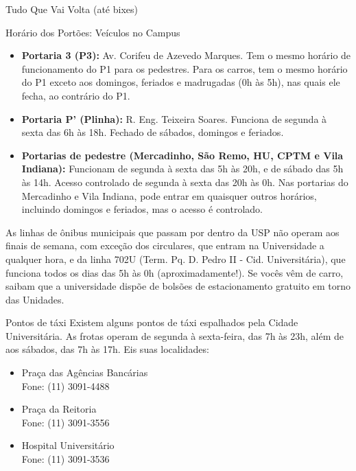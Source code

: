 \begin{secao}{Tudo Que Vai Volta (até bixes)}
\begin{subsecao}{Horário dos Portões: Veículos no Campus}
\begin{itemize}
  \item {\bf Portaria 3 (P3):} Av. Corifeu de Azevedo Marques. Tem o mesmo
  	horário de funcionamento do P1 para os pedestres. Para os carros, tem o
	mesmo horário do P1 exceto aos domingos, feriados e madrugadas (0h às 5h),
	nas quais ele fecha, ao contrário do P1.

  \item {\bf Portaria P' (Plinha):} R. Eng. Teixeira Soares. Funciona de segunda
  	à sexta das 6h às 18h. Fechado de sábados, domingos e feriados.

  \item {\bf Portarias de pedestre (Mercadinho, São Remo, HU, CPTM e
  	Vila Indiana):} Funcionam de segunda à sexta das 5h às 20h, e de sábado
	das 5h às 14h. Acesso controlado de segunda à sexta das 20h às 0h.
	Nas portarias do Mercadinho e Vila Indiana, pode entrar em quaisquer
	outros horários, incluindo domingos e feriados, mas o acesso é controlado.

\end{itemize}

As linhas de ônibus municipais que passam por dentro da USP não operam aos
finais de semana, com exceção dos circulares, que entram na Universidade a
qualquer hora, e da linha 702U (Term. Pq. D. Pedro II - Cid. Universitária), que
funciona todos os dias das 5h às 0h (aproximadamente!). Se vocês vêm de carro,
saibam que a universidade dispõe de bolsões de estacionamento gratuito em torno
das Unidades.

\end{subsecao}
\pagebreak
\begin{subsecao}{Pontos de táxi}
Existem alguns pontos de táxi espalhados pela Cidade Universitária. As frotas
operam de segunda à sexta-feira, das 7h às 23h, além de aos sábados, das 7h às
17h. Eis suas localidades:

\begin{itemize}
\item Praça das Agências Bancárias\\
Fone: (11) 3091-4488

\item Praça da Reitoria\\
Fone: (11) 3091-3556

\item Hospital Universitário\\
Fone: (11) 3091-3536
\end{itemize}
\end{subsecao}

\end{secao}
